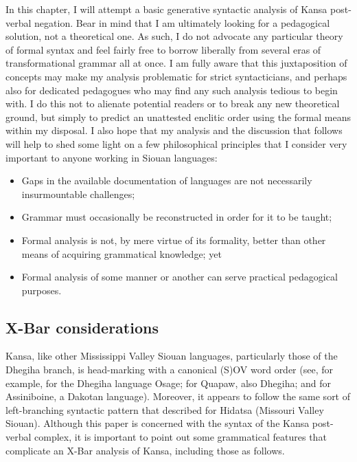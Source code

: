 \documentclass[output=paper]{LSP/langsci}
\begin{document}
In this chapter, I will attempt a basic generative syntactic analysis of Kansa post-verbal negation. Bear in mind that I am ultimately looking for a pedagogical solution, not a theoretical one. As such, I do not advocate any particular theory of formal syntax and feel fairly free to borrow liberally from several eras of transformational grammar all at once. I am fully aware that this juxtaposition of concepts may make my analysis problematic for strict syntacticians, and perhaps also for dedicated pedagogues who may find any such analysis tedious to begin with. I do this not to alienate potential readers or to break any new theoretical ground, but simply to predict an unattested enclitic order using the formal means within my disposal. I also hope that my analysis and the discussion that follows will help to shed some light on a few philosophical principles that I consider very important to anyone working in Siouan languages:

\begin{itemize}
\item Gaps in the available documentation of languages are not necessarily insurmountable challenges;
\item Grammar must occasionally be reconstructed in order for it to be taught;
\item Formal analysis is not, by mere virtue of its formality, better than other means of acquiring grammatical knowledge; yet
\item Formal analysis of some manner or another can serve practical pedagogical purposes.
\end{itemize}

\subsection{X-Bar considerations}
Kansa, like other Mississippi Valley Siouan languages, particularly those of the Dhegiha branch, is head-marking with a canonical (S)OV word order (see, for example, \citet[421]{Quintero2004} for the Dhegiha language Osage; \citet[488--490]{Rankin2005b} for Quapaw, also Dhegiha; and \citet[369]{Cumberland2005} for Assiniboine, a Dakotan language). Moreover, it appears to follow the same sort of left-branching syntactic pattern that \citet{Boyle2007} described for Hidatsa (Missouri Valley Siouan). Although this paper is concerned with the syntax of the Kansa post-verbal complex, it is important to point out some grammatical features that complicate an X-Bar analysis of Kansa, including those as follows.
\end{document}

